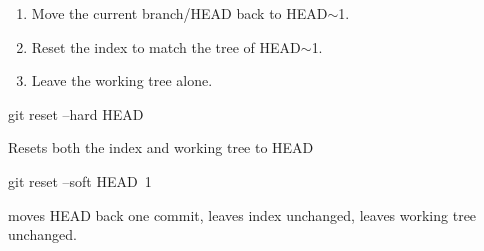 \documentclass{report}
\begin{document}
\begin{itemize}
\begin{itemize}
\begin{enumerate}
                        \item Move the current branch/HEAD back to HEAD$\sim$1.
                        \item Reset the index to match the tree of HEAD$\sim$1.
                        \item Leave the working tree alone.
                    \end{enumerate}
                    \bigbreak \noindent 
                    \begin{bashcode}
                        git reset --hard HEAD
                    \end{bashcode}
                    \bigbreak \noindent 
                    Resets both the index and working tree to HEAD
                    \bigbreak \noindent 
                    \begin{cppcode}
                        git reset --soft HEAD~1
                    \end{cppcode}
                    \bigbreak \noindent 
                    moves HEAD back one commit, leaves index unchanged, leaves working tree unchanged.


\end{itemize}
\end{itemize}
\end{document}

